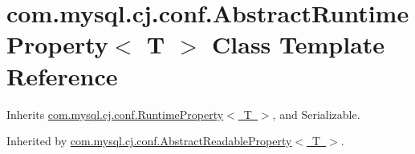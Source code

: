 \hypertarget{classcom_1_1mysql_1_1cj_1_1conf_1_1_abstract_runtime_property}{}\section{com.\+mysql.\+cj.\+conf.\+Abstract\+Runtime\+Property$<$ T $>$ Class Template Reference}
\label{classcom_1_1mysql_1_1cj_1_1conf_1_1_abstract_runtime_property}


Inherits \mbox{\hyperlink{interfacecom_1_1mysql_1_1cj_1_1conf_1_1_runtime_property}{com.\+mysql.\+cj.\+conf.\+Runtime\+Property$<$ T $>$}}, and Serializable.



Inherited by \mbox{\hyperlink{classcom_1_1mysql_1_1cj_1_1conf_1_1_abstract_readable_property}{com.\+mysql.\+cj.\+conf.\+Abstract\+Readable\+Property$<$ T $>$}}.

